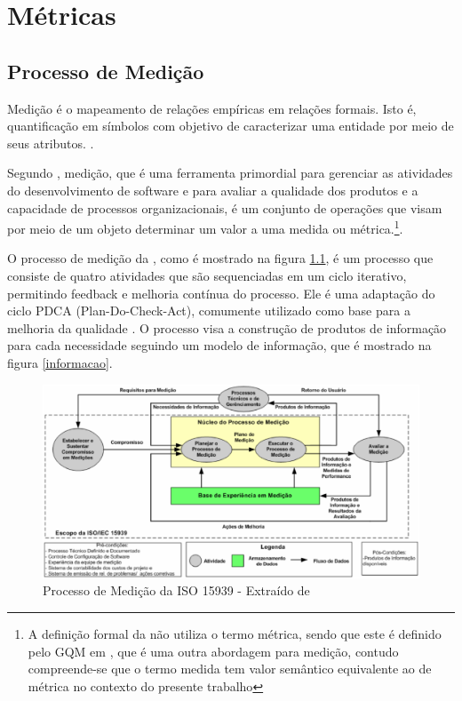 \chapter{Métricas}

\section{Processo de Medição}

	Medição é o mapeamento de relações empíricas em relações formais. Isto é, quantificação em símbolos com objetivo de caracterizar uma entidade por meio de seus atributos. \cite{Fenton98}.
	
	Segundo , medição, que é uma ferramenta primordial para gerenciar as atividades do desenvolvimento de software e para avaliar a qualidade dos produtos e a capacidade de processos organizacionais,  é um conjunto de operações que visam por meio de um objeto determinar um valor a uma medida ou métrica.\footnote{A definição formal da  não utiliza o termo métrica, sendo que este é definido pelo GQM em , que é uma outra abordagem para medição, contudo compreende-se que o termo medida tem valor semântico equivalente ao de métrica no contexto do presente trabalho}. 
	
	
	O processo de medição da , como é mostrado na figura \ref{processo}, é um processo que consiste  de quatro atividades que são sequenciadas em um ciclo iterativo, permitindo
	feedback e melhoria contínua do processo. Ele é uma adaptação do ciclo PDCA (Plan-Do-Check-Act), comumente utilizado como base para a melhoria da qualidade \cite{Barcellos2010}.  O processo visa a construção de produtos de informação para cada necessidade seguindo um modelo de informação, que é mostrado na figura \ref{informacao}.
		
		\begin{figure}[h]
		\centering
		
			\includegraphics[keepaspectratio=true,scale=0.6]{figuras/processodemedicao15939.eps}
		\caption{Processo de Medição da ISO 15939 - Extraído de \cite{Gava2006}}
		\label{processo}
	\end{figure}
		

